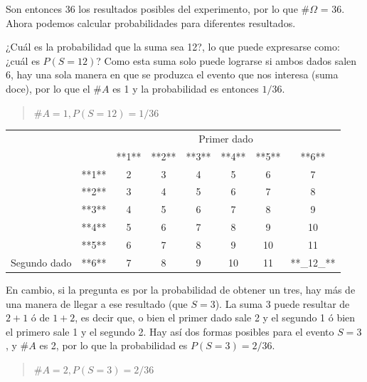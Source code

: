 \documentclass[]{book}
\begin{document}
Son entonces 36 los resultados posibles del experimento, por lo que \(\#\Omega\)
= 36. Ahora podemos calcular probabilidades para diferentes resultados.

¿Cuál es la probabilidad que la suma sea 12?, lo que puede expresarse
como: ¿cuál es \(P(S=12)\)? Como esta suma solo puede lograrse si ambos
dados salen 6, hay una sola manera en que se produzca el evento que nos
interesa (suma doce), por lo que el \(\#A\) es 1 y la probabilidad es
entonces \(1/36\).

\begin{quote}
\(\#A = 1, P(S = 12)=1/36\)
\end{quote}

\begin{table}[H]
\centering
\begin{tabular}{lccccccc}
\toprule
\multicolumn{2}{c}{ } & \multicolumn{6}{c}{Primer dado} \\
\cmidrule(l{3pt}r{3pt}){3-8}
 &  & **1** & **2** & **3** & **4** & **5** & **6**\\
\midrule
\rowcolor{gray!6}   & **1** & 2 & 3 & 4 & 5 & 6 & 7\\
\cmidrule{2-8}
 & **2** & 3 & 4 & 5 & 6 & 7 & 8\\
\cmidrule{2-8}
\rowcolor{gray!6}   & **3** & 4 & 5 & 6 & 7 & 8 & 9\\
\cmidrule{2-8}
 & **4** & 5 & 6 & 7 & 8 & 9 & 10\\
\cmidrule{2-8}
\rowcolor{gray!6}   & **5** & 6 & 7 & 8 & 9 & 10 & 11\\
\cmidrule{2-8}
\multirow[t]{-6}{*}{\raggedright\arraybackslash Segundo dado} & **6** & 7 & 8 & 9 & 10 & 11 & **\_12\_**\\
\bottomrule
\end{tabular}
\end{table}

En cambio, si la pregunta es por la probabilidad de obtener un tres, hay
más de una manera de llegar a ese resultado (que \(S = 3\)). La suma 3 puede
resultar de \(2+1\) ó de \(1+2\), es decir que, o bien el primer dado sale 2 y
el segundo 1 ó bien el primero sale 1 y el segundo 2. Hay así dos formas
posibles para el evento \(S = 3\), y \(\#A\) es 2, por lo que la probabilidad es
\(P(S = 3) = 2/36\).

\begin{quote}
\(\#A = 2, P(S = 3)=2/36\)
\end{quote}
\end{document}
